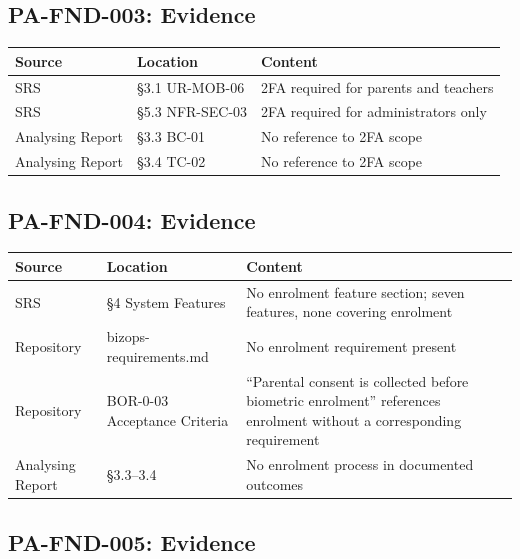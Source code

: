 \documentclass[11pt,a4paper]{article}
\begin{document}
\subsection{PA-FND-003: Evidence}

\begin{table}[H]
\centering\small
\begin{tabular}{|l|L{3cm}|>{\RaggedRight\arraybackslash}m{6.5cm}|}
\hline
{}
\textbf{Source} & \textbf{Location} & \textbf{Content} \\\hline
SRS & \S3.1 UR-MOB-06 & 2FA required for parents and teachers \\\hline
SRS & \S5.3 NFR-SEC-03 & 2FA required for administrators only \\\hline
Analysing Report & \S3.3 BC-01 & No reference to 2FA scope \\\hline
Analysing Report & \S3.4 TC-02 & No reference to 2FA scope \\\hline
\end{tabular}
\end{table}

\subsection{PA-FND-004: Evidence}

\begin{table}[H]
\centering\small
\begin{tabular}{|l|L{3cm}|>{\RaggedRight\arraybackslash}m{6.5cm}|}
\hline
{}
\textbf{Source} & \textbf{Location} & \textbf{Content} \\\hline
SRS & \S4 System Features & No enrolment feature section; seven features, none covering enrolment \\\hline
Repository & bizops-requirements.md & No enrolment requirement present \\\hline
Repository & BOR-0-03 Acceptance Criteria & ``Parental consent is collected before biometric enrolment'' references enrolment without a corresponding requirement \\\hline
Analysing Report & \S3.3--3.4 & No enrolment process in documented outcomes \\\hline
\end{tabular}
\end{table}

\subsection{PA-FND-005: Evidence}
\end{document}
